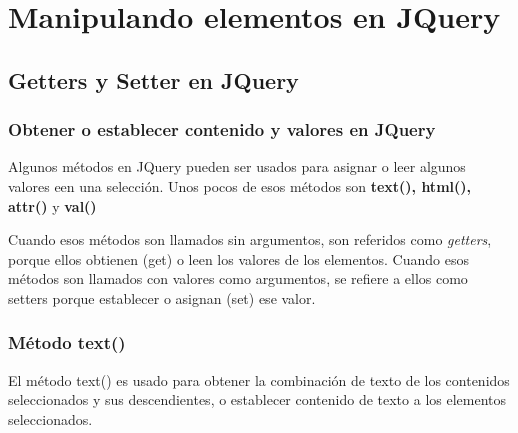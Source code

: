 \documentclass[11pt]{article}
\begin{document}
\section*{Manipulando elementos en JQuery}
\label{sec:orgb028c29}

\subsection*{Getters y Setter en JQuery}
\label{sec:org6aa4499}

\subsubsection*{Obtener o establecer contenido y valores en JQuery}
\label{sec:orgb9ad848}

Algunos métodos en JQuery pueden ser usados para asignar o leer algunos valores een una selección. Unos pocos de esos métodos son \textbf{text(), html(), attr()} y \textbf{val()} 

Cuando esos métodos son llamados sin argumentos, son referidos como \emph{getters}, porque ellos obtienen (get) o leen los valores de los elementos. Cuando esos métodos son llamados con valores como argumentos, se refiere a ellos como  setters porque establecer o asignan (set) ese valor.

\subsubsection*{Método text()}
\label{sec:orgfc64f97}

El método text() es usado para obtener la combinación de texto de los contenidos seleccionados y sus descendientes, o establecer contenido de texto a los elementos seleccionados.
\end{document}
